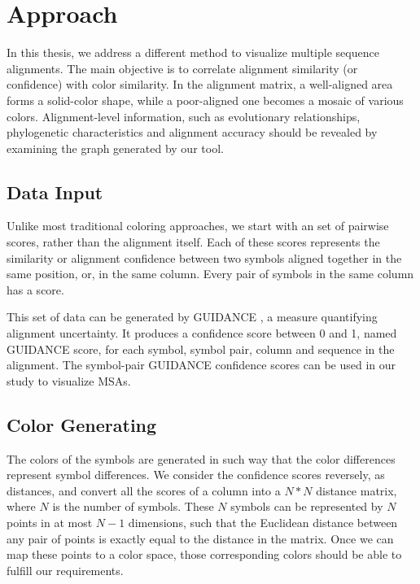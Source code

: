 \chapter{Approach}\label{chap:Approach}

In this thesis, we address a different method to visualize multiple sequence alignments. The main objective is to correlate alignment similarity (or confidence) with color similarity. In the alignment matrix, a well-aligned area forms a solid-color shape, while a poor-aligned one becomes a mosaic of various colors. Alignment-level information, such as evolutionary relationships, phylogenetic characteristics and alignment accuracy should be revealed by examining the graph generated by our tool.

\section{Data Input}

Unlike most traditional coloring approaches, we start with an set of pairwise scores, rather than the alignment itself. Each of these scores represents the similarity or alignment confidence between two symbols aligned together in the same position, or, in the same column. Every pair of symbols in the same column has a score.

This set of data can be generated by GUIDANCE \cite{Penn:2010aa,Penn:2010ab}, a measure quantifying alignment uncertainty. It produces a confidence score between 0 and 1, named GUIDANCE score, for each symbol, symbol pair, column and sequence in the alignment. The symbol-pair GUIDANCE confidence scores can be used in our study to visualize MSAs.

\section{Color Generating}

The colors of the symbols are generated in such way that the color differences represent symbol differences. We consider the confidence scores reversely, as distances, and convert all the scores of a column into a $N*N$ distance matrix, where $N$ is the number of symbols. These $N$ symbols can be represented by $N$ points in at most $N-1$ dimensions, such that the Euclidean distance between any pair of points is exactly equal to the distance in the matrix. Once we can map these points to a color space, those corresponding colors should be able to fulfill our requirements.

